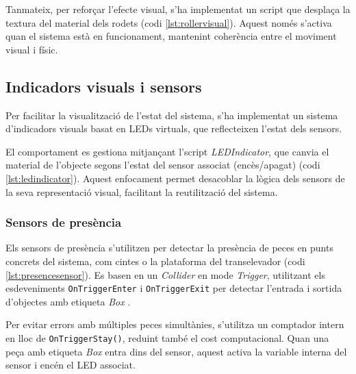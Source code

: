 \documentclass[a4paper,11pt,DIV=13,headings=normal,abstract=true,twoside=semi]{article}
\begin{document}
Tanmateix, per reforçar l'efecte visual, s'ha implementat un script que desplaça la textura del material dels rodets (codi \ref{lst:rollervisual}). Aquest només s'activa quan el sistema està en funcionament, mantenint coherència entre el moviment visual i físic.

\subsection{Indicadors visuals i sensors}

Per facilitar la visualització de l'estat del sistema, s'ha implementat un sistema d'indicadors visuals basat en LEDs virtuals, que reflecteixen l'estat dels sensors.

El comportament es gestiona mitjançant l'script \textit{LEDIndicator}, que canvia el material \cite{UnityMaterialsReference} de l'objecte segons l'estat del sensor associat (encès/apagat) (codi \ref{lst:ledindicator}). Aquest enfocament permet desacoblar la lògica dels sensors de la seva representació visual, facilitant la reutilització del sistema.
%
%

\subsubsection{Sensors de presència}

Els sensors de presència s'utilitzen per detectar la presència de peces en punts concrets del sistema, com cintes o la plataforma del transelevador (codi \ref{lst:presencesensor}).  Es basen en un \textit{Collider} en mode \textit{Trigger}, utilitzant els esdeveniments \texttt{OnTriggerEnter} i \texttt{OnTriggerExit} per detectar l'entrada i sortida d'objectes amb etiqueta \textit{Box} \cite{UnityColliders, UnityComponents}.

Per evitar errors amb múltiples peces simultànies, s'utilitza un comptador intern en lloc de \texttt{OnTriggerStay()}, reduint també el cost computacional. Quan una peça amb etiqueta \textit{Box} entra dins del sensor, aquest activa la variable interna del sensor i encén el LED associat.
\end{document}
